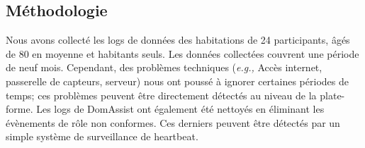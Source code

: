 
\subsection{Méthodologie}\label{validation:methodology}
Nous avons collecté les logs de données des habitations de 24 participants, âgés de 80 en moyenne et habitants seuls. Les données collectées couvrent une période de neuf mois. Cependant, des problèmes techniques ({\em e.g.,} Accès internet, passerelle de capteurs, serveur) nous ont poussé à ignorer certaines périodes de temps; ces problèmes peuvent être directement détectés au niveau de la plate-forme. Les logs de DomAssist ont également été nettoyés en éliminant les évènements de rôle non conformes. Ces derniers peuvent être détectés par un simple système de surveillance de heartbeat.

